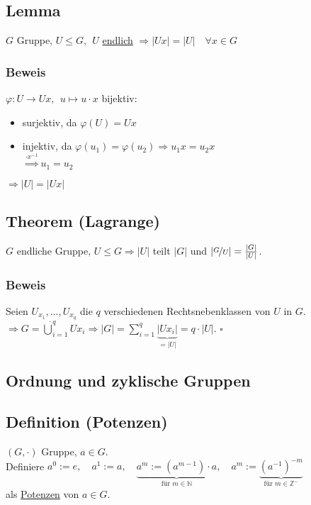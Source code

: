 \documentclass[a4paper, 12pt,titlepage, pdf, headsepline]{article}
\newcommand{\f}[2]{\nicefrac{#1}{#2}}
\newcommand{\uline}[1]{\underline{#1}}
\renewcommand{\>}{\rightarrow}
\renewcommand{\*}{\cdot}
\renewcommand{\phi}{\varphi}
\begin{document}
	      \subsection{Lemma}
	      $G$ Gruppe, $U \leq G,~~ U$ \uline{endlich} $\Rightarrow |Ux| = |U|\quad \forall x \in G$
	      \subsubsection*{Beweis}
	      $\phi: U \rightarrow Ux,~~ u \mapsto u \cdot x$ bijektiv:
	      \begin{itemize}
	      	\item surjektiv, da $\phi(U) = Ux$
	      	\item injektiv, da $\phi(u_1) = \phi(u_2) \Rightarrow u_1x = u_2x$\\
	      	      \noindent\hspace*{44.5mm}$\overset{\cdot x^{-1}}{\Rightarrow} u_1 = u_2$
	      \end{itemize}
	      $ \Rightarrow |U| = |Ux|$
	      \subsection{Theorem (Lagrange)}
	      $G$ endliche Gruppe, $U \leq G \Rightarrow |U|$ teilt $|G|$ und $| \f{G}{U} | = \frac{|G|}{|U|}$.
	      \subsubsection*{Beweis} Seien $U_{x_1},..., U_{x_q}$ die $q$ verschiedenen Rechtsnebenklassen von $U$ in $G$. \\
	      $\Rightarrow G = \dot{\bigcup}^q_{i=1} Ux_i \Rightarrow |G| =  \sum_{i = 1}^{q}  \underbrace{|Ux_i|}_{=|U|} = q \cdot |U|.$
	      \hfill$\square$
	      \subsection*{Ordnung und zyklische Gruppen}
	      \subsection{Definition (Potenzen)}
	      $(G, \cdot )$ Gruppe, $a \in G$.\\ Definiere $a^0 := e,\quad a^1 := a,\quad \underbrace{a^m := (a^{m-1}) \cdot a}_{\textrm{für }m \in \mathds{N}},\quad a^m := \underbrace{ (a^{-1})^{-m}}_{\textrm{für }m \in \mathds{Z}^-}$\\
	      als \uline{Potenzen} von $a \in G$.
\end{document}
